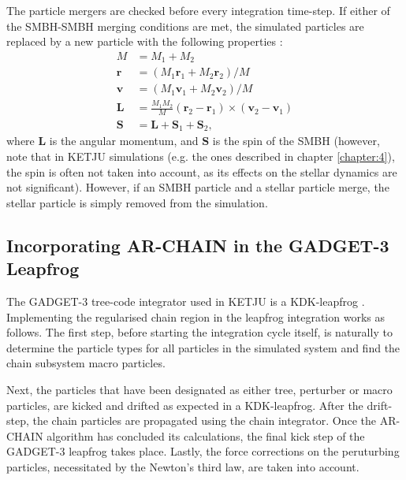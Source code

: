\documentclass[english, twoside]{HYgradu}
\begin{document}
The particle mergers are checked before every integration time-step. If either of the SMBH-SMBH merging conditions are met, the simulated particles are replaced by a new particle with the following properties \citep{Rantala2017KETJU}:
\begin{equation}
\begin{split}
M &= M_1 + M_2 \\
\mathbf{r} &= (M_1 \mathbf{r}_1 + M_2 \mathbf{r}_2) / M \\
\mathbf{v} &= (M_1 \mathbf{v}_1 + M_2 \mathbf{v}_2) / M \\
\mathbf{L} &= \frac{M_1 M_2}{M} (\mathbf{r}_2 - \mathbf{r}_1) \times (\mathbf{v}_2 - \mathbf{v}_1) \\
\mathbf{S} &= \mathbf{L} + \mathbf{S}_1 + \mathbf{S}_2,
\end{split}
\end{equation}
where $\mathbf{L}$ is the angular momentum, and $\mathbf{S}$ is the spin of the SMBH (however, note that in KETJU simulations (e.g. the ones described in chapter \ref{chapter:4}), the spin is often not taken into account, as its effects on the stellar dynamics are not significant). However, if an SMBH particle and a stellar particle merge, the stellar particle is simply removed from the simulation.

\subsection{Incorporating AR-CHAIN in the GADGET-3 Leapfrog} \label{section:archain_plus_gadget}

The GADGET-3 tree-code integrator used in KETJU is a KDK-leapfrog \citep{Springel2005}. Implementing the regularised chain region in the leapfrog integration works as follows. The first step, before starting the integration cycle itself, is naturally to determine the particle types for all particles in the simulated system and find the chain subsystem macro particles. 

Next, the particles that have been designated as either tree, perturber or macro particles, are kicked and drifted as expected in a KDK-leapfrog. After the drift-step, the chain particles are propagated using the chain integrator. Once the AR-CHAIN algorithm has concluded its calculations, the final kick step of the GADGET-3 leapfrog takes place. Lastly, the force corrections on the peruturbing particles, necessitated by the Newton's third law, are taken into account. 
\end{document}
